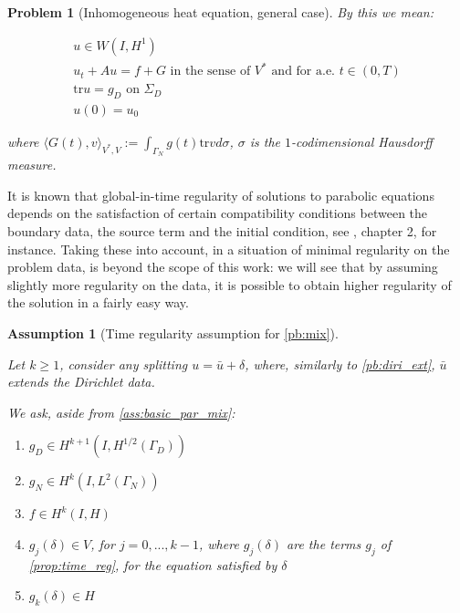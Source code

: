 \documentclass[english,a4paper,10pt,oneside]{scrbook}	%
\theoremstyle{break}
\newtheorem{ass}[equation]{Assumption}
\newtheorem{pb}[equation]{Problem}
\theoremstyle{remark}
\newcommand{\ds}{\displaystyle}
\newcommand{\tr}{\text{tr}}
\begin{document}
\begin{appendices}
\begin{pb}[Inhomogeneous heat equation, general case]
By this we mean:

\begin{align*}
u \in W(I,H^1) \\
u_t + A u = f + G \text{ in the sense of } V^* \text{ and for a.e. } t \in (0,T) \\
\tr u =g_D \text{ on } \Sigma_D\\
u(0)=u_0
\end{align*}

where $\ds \langle G(t), v \rangle_{V^*,V}:=\int_{\Gamma_N} g(t)\tr v d\sigma$, $\sigma$ is the $1$-codimensional Hausdorff measure.

\end{pb}

It is known that global-in-time regularity of solutions to parabolic equations depends on the satisfaction of certain compatibility conditions between the boundary data, the source term and the initial condition, see \cite{lions}, chapter 2, for instance. Taking these into account, in a situation of minimal regularity on the problem data, is beyond the scope of this work: we will see that by assuming slightly more regularity on the data, it is possible to obtain higher regularity of the solution in a fairly easy way.


\begin{ass}[Time regularity assumption for \cref{pb:mix}]
\label{ass:time_reg_mix}

Let $k\geq 1$, consider any splitting $u = \bar{u} + \delta$, where, similarly to \cref{pb:diri_ext}, $\bar{u}$ extends the Dirichlet data.

We ask, aside from \cref{ass:basic_par_mix}:

\begin{enumerate}
	\item $g_D \in H^{k+1}(I, H^{1/2}(\Gamma_D))$
	\item $g_N \in H^{k}(I, L^2(\Gamma_N))$
	\item $f \in H^k(I, H)$
	\item $g_j(\delta)  \in V$, for $j=0,...,k-1$, where $g_j(\delta)$ are the terms $g_j$ of \cref{prop:time_reg}, for the equation satisfied by $\delta$
	\item $g_k(\delta) \in H$
\end{enumerate}
\end{ass}


\end{appendices}
\end{document}
